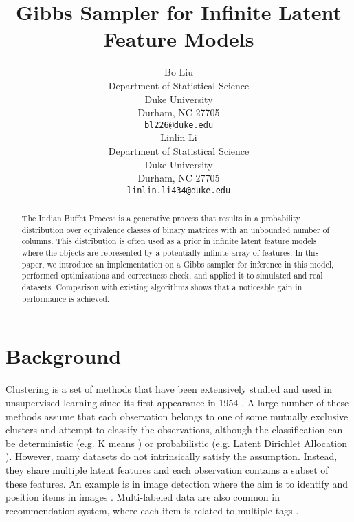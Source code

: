 \documentclass{article}
\title{Gibbs Sampler for Infinite Latent Feature Models}
\author{%
  Bo Liu \\
  Department of Statistical Science\\
  Duke University\\
  Durham, NC 27705 \\
  \texttt{bl226@duke.edu} \\
  \And
  Linlin Li \\
  Department of Statistical Science\\
  Duke University\\
  Durham, NC 27705 \\
  \texttt{linlin.li434@duke.edu} \\
}
\begin{document}
\maketitle

\begin{abstract}
  The Indian Buffet Process is a generative process that results in a probability distribution over equivalence classes of binary matrices with an unbounded number of columns. This distribution is often used as a prior in infinite latent feature models where the objects are represented by a potentially infinite array of features. In this paper, we introduce an implementation on a Gibbs sampler for inference in this model, performed optimizations and correctness check, and applied it to simulated and real datasets. Comparison with existing algorithms shows that a noticeable gain in performance is achieved.
\end{abstract}

\section{Background}

Clustering is a set of methods that have been extensively studied and used in unsupervised learning since its first appearance in 1954 \citep{caron2018deep}. A large number of these methods assume that each observation belongs to one of some mutually exclusive clusters and attempt to classify the observations, although the classification can be deterministic (e.g. K means \citep{steinhaus1956division, lloyd1982least}) or probabilistic (e.g. Latent Dirichlet Allocation \citep{blei2003latent}). However, many datasets do not intrinsically satisfy the assumption. Instead, they share multiple latent features and each observation contains a subset of these features. An example is in image detection where the aim is to identify and position items in images \citep{zhang2018multilabel}. Multi-labeled data are also common in recommendation system, where each item is related to multiple tags \citep{zheng2014context}.
\end{document}
